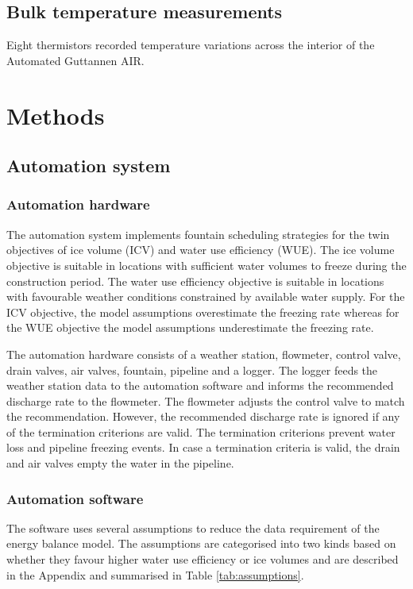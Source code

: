 \documentclass[tc, manuscript]{copernicus}
\begin{document}
\subsection{Bulk temperature measurements}

Eight thermistors recorded temperature variations across the interior of the Automated Guttannen AIR. 

\section{Methods}

\subsection{Automation system}

\subsubsection{Automation hardware}

The automation system implements fountain scheduling strategies for the twin objectives of ice volume (ICV) and
water use efficiency (WUE). The ice volume objective is suitable in locations with sufficient water volumes to
freeze during the construction period. The water use efficiency objective is suitable in locations with
favourable weather conditions constrained by available water supply. For the ICV objective, the model
assumptions overestimate the freezing rate whereas for the WUE objective the model assumptions underestimate the
freezing rate. 

The automation hardware consists of a weather station, flowmeter, control valve, drain valves, air valves,
fountain, pipeline and a logger. The logger feeds the weather station data to the automation software and
informs the recommended discharge rate to the flowmeter. The flowmeter adjusts the control valve to match the
recommendation. However, the recommended discharge rate is ignored if any of the termination criterions are
valid. The termination criterions prevent water loss and pipeline freezing events. In case a termination
criteria is valid, the drain and air valves empty the water in the pipeline.

\subsubsection{Automation software}

The software uses several assumptions to reduce the data requirement of the energy balance model. The
assumptions are categorised into two kinds based on whether they favour higher water use efficiency or ice
volumes and are described in the Appendix and summarised in Table \ref{tab:assumptions}.  
\end{document}
